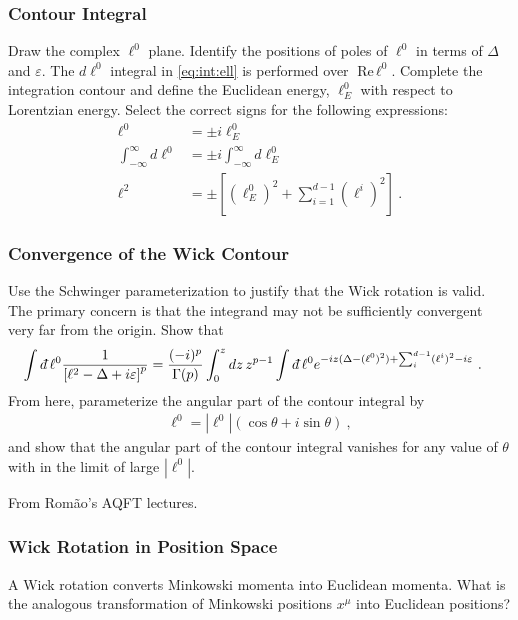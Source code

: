 \documentclass[12pt]{article}
\numberwithin{equation}{subsection}    %
\newcommand{\dbar}{d\mkern-6mu\mathchar'26}    %
\begin{document}
\subsubsection{Contour Integral}

Draw the complex $\ell^0$ plane. Identify the positions of poles of $\ell^0$ in terms of $\Delta$ and $\varepsilon$. The $d\ell^0$ integral in \eqref{eq:int:ell} is performed over $\text{Re}\,\ell^0$. Complete the integration contour and define the Euclidean energy, $\ell^0_E$ with respect to Lorentzian energy. Select the correct signs for the following expressions:
\begin{align}
	\ell^0 &= \pm i \ell_E^0 \\
	\int_{-\infty}^\infty d\ell^0 &= \pm i \int_{-\infty}^\infty d\ell_E^0 \ \\
	\ell^2 &= \pm \left[ \left(\ell_E^0\right)^2 + \sum_{i=1}^{d-1}(\ell^i)^2 \right] \ .
\end{align}

\subsubsection{Convergence of the Wick Contour}

Use the Schwinger parameterization to justify that the Wick rotation is valid. The primary concern is that the integrand may not be sufficiently convergent very far from the origin. Show that 
\begin{align}
	\int \dbar \ell^0 \frac{1}{\left[\ell^2 - \Delta + i\varepsilon\right]^p}
	&=
	\frac{(-i)^p}{\Gamma(p)}\int_0^z dz \, z^{p-1} \int \dbar\ell^0 e^{-iz(\Delta - (\ell^0)^2) + \sum_i^{d-1}(\ell^i)^2-i\varepsilon}
	\ .
\end{align}
From here, parameterize the angular part of the contour integral by
\begin{align}
	\ell^0 = |\ell^0| \left(\cos \theta + i\sin \theta\right) \ ,
\end{align}
and show that the angular part of the contour integral vanishes for any value of $\theta$ with in the limit of large $|\ell^0|$.


{\footnotesize From Romão's AQFT lectures.}


\subsubsection{Wick Rotation in Position Space}

A Wick rotation converts Minkowski momenta into Euclidean momenta. What is the analogous transformation of Minkowski positions $x^\mu$ into Euclidean positions?
\end{document}
